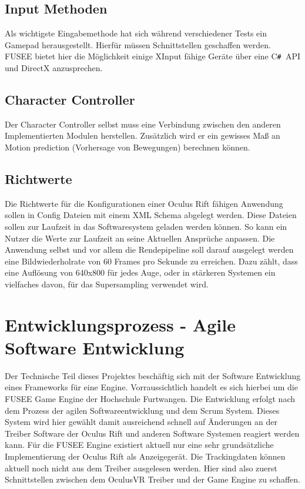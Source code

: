 \documentclass[pagesize, paper=a4, fontsize=12pt,titlepage=true, headings=small, headnosepline, abstractoff, liststotoc, nochapterprefix, plainheadsepline]{scrreprt}
\newcommand{\CSS}{C\texttt{\# }}
\begin{document}
\subsection{Input Methoden}
Als wichtigste Eingabemethode hat sich während verschiedener Tests ein Gamepad herausgestellt. Hierfür müssen Schnittstellen geschaffen werden. FUSEE bietet hier die Möglichkeit einige XInput fähige Geräte über eine \CSS API und DirectX anzusprechen. 
\subsection{Character Controller}
Der Character Controller selbst muss eine Verbindung zwischen den anderen Implementierten Modulen herstellen. Zusätzlich wird er ein gewisses Maß an Motion prediction (Vorhersage von Bewegungen) berechnen können.
\subsection{Richtwerte}
Die Richtwerte für die Konfigurationen einer Oculus Rift fähigen Anwendung sollen in Config Dateien mit einem XML Schema abgelegt werden. Diese Dateien sollen zur Laufzeit in das Softwaresystem geladen werden können. So kann ein Nutzer die Werte zur Laufzeit an seine Aktuellen Ansprüche anpassen. Die Anwendung selbst und vor allem die Rendepipeline soll darauf ausgelegt werden eine Bildwiederholrate von 60 Frames pro Sekunde zu erreichen. Dazu zählt, dass eine Auflösung von 640x800 für jedes Auge, oder in stärkeren Systemen ein vielfaches davon, für das Supersampling verwendet wird.

\section{Entwicklungsprozess - Agile Software Entwicklung}
Der Technische Teil dieses Projektes beschäftig sich mit der Software Entwicklung eines Frameworks für eine Engine. Vorraussichtlich handelt es sich hierbei um die FUSEE Game Engine der Hochschule Furtwangen. Die Entwicklung erfolgt nach dem Prozess der agilen Softwareentwicklung und dem Scrum System. Dieses System wird hier gewählt damit ausreichend schnell auf Änderungen an der Treiber Software der Oculus Rift und anderen Software Systemen reagiert werden kann. Für die FUSEE Engine existiert aktuell nur eine sehr grundsätzliche Implementierung der Oculus Rift als Anzeigegerät. Die Trackingdaten können aktuell noch nicht aus dem Treiber ausgelesen werden. Hier sind also zuerst Schnittstellen zwischen dem OculusVR Treiber und der Game Engine zu schaffen. 
\end{document}
